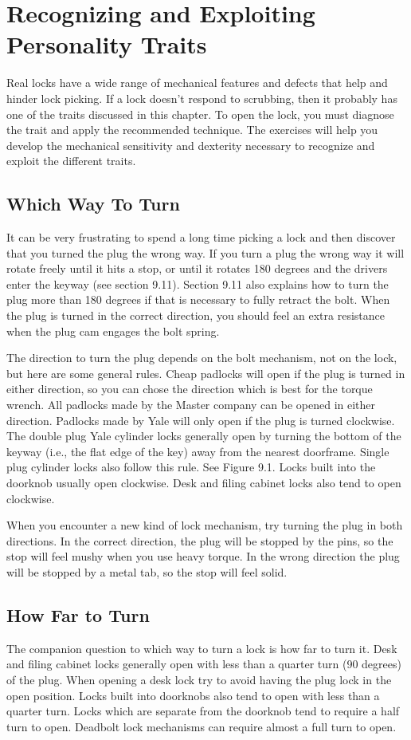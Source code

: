\chapter{Recognizing and Exploiting Personality Traits}
Real locks have a wide range of mechanical features and defects that help and hinder lock
picking. If a lock doesn't respond to scrubbing, then it probably has one of the traits
discussed in this chapter. To open the lock, you must diagnose the trait and apply the
recommended technique. The exercises will help you develop the mechanical sensitivity and
dexterity necessary to recognize and exploit the different traits.

\section{Which Way To Turn}
It can be very frustrating to spend a long time picking a lock and then discover that you
turned the plug the wrong way. If you turn a plug the wrong way it will rotate freely until it
hits a stop, or until it rotates 180 degrees and the drivers enter the keyway (see section 9.11).
Section 9.11 also explains how to turn the plug more than 180 degrees if that is necessary
to fully retract the bolt. When the plug is turned in the correct direction, you should feel
an extra resistance when the plug cam engages the bolt spring.

The direction to turn the plug depends on the bolt mechanism, not on the lock, but here
are some general rules. Cheap padlocks will open if the plug is turned in either direction, so
you can chose the direction which is best for the torque wrench. All padlocks made by the
Master company can be opened in either direction. Padlocks made by Yale will only open if
the plug is turned clockwise. The double plug Yale cylinder locks generally open by turning
the bottom of the keyway (i.e., the flat edge of the key) away from the nearest doorframe.
Single plug cylinder locks also follow this rule. See Figure 9.1. Locks built into the doorknob
usually open clockwise. Desk and filing cabinet locks also tend to open clockwise.

When you encounter a new kind of lock mechanism, try turning the plug in both directions. In the correct direction, the plug will be stopped by the pins, so the stop will feel
mushy when you use heavy torque. In the wrong direction the plug will be stopped by a
metal tab, so the stop will feel solid.

\section{How Far to Turn}
The companion question to which way to turn a lock is how far to turn it. Desk and filing
cabinet locks generally open with less than a quarter turn (90 degrees) of the plug. When
opening a desk lock try to avoid having the plug lock in the open position. Locks built into
doorknobs also tend to open with less than a quarter turn. Locks which are separate from
the doorknob tend to require a half turn to open. Deadbolt lock mechanisms can require
almost a full turn to open.

